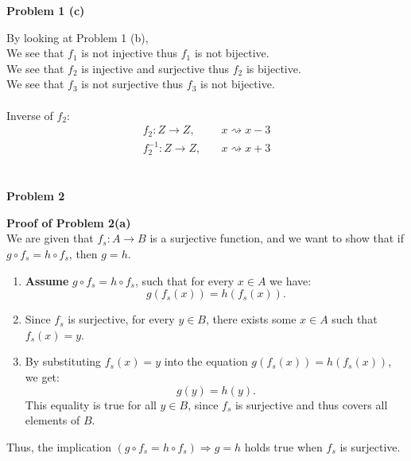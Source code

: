 \documentclass{article}
\begin{document}
\begin{flushleft}
   \textbf{\Large Problem 1 (c)}
\end{flushleft}

By looking at Problem 1 (b), \\
We see that \(f_1\) is not injective thus \(f_1\) is not bijective. \\
We see that \(f_2\) is injective and surjective thus \(f_2\) is bijective. \\
We see that \(f_3\) is not surjective thus \(f_3\) is not bijective. \\
\\
Inverse of \(f_2\):
\begin{align*}
   f_2: Z \rightarrow Z,& \quad x \rightsquigarrow x - 3 \\
   f_2^{-1}: Z \rightarrow Z,& \quad x \rightsquigarrow x + 3 \\
\end{align*}
\\

\begin{flushleft}
   \textbf{\Large Problem 2}
\end{flushleft}

\begin{flushleft}
   \textbf{Proof of Problem 2(a)}\\
   
   We are given that \( f_s : A \to B \) is a surjective function, and we want to show that if \( g \circ f_s = h \circ f_s \), then \( g = h \).

   \begin{enumerate}
      \item \textbf{Assume} \( g \circ f_s = h \circ f_s \), such that for every \( x \in A \) we have:
      \[
      g(f_s(x)) = h(f_s(x)).
      \]
      \item Since \( f_s \) is surjective, for every \( y \in B \), there exists some \( x \in A \) such that \( f_s(x) = y \).
      \item By substituting \( f_s(x) = y \) into the equation \( g(f_s(x)) = h(f_s(x)) \), we get:
      \[
      g(y) = h(y).
      \]
      This equality is true for all \( y \in B \), since \( f_s \) is surjective and thus covers all elements of \( B \).
   \end{enumerate}
   
   Thus, the implication \( (g \circ f_s = h \circ f_s) \Rightarrow g = h \) holds true when \( f_s \) is surjective.
\end{flushleft}
\end{document}
